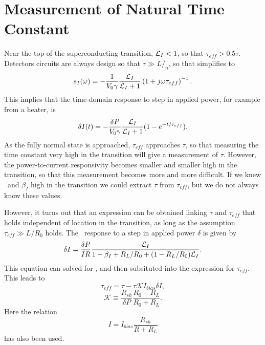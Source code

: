 \section{Measurement of Natural Time Constant}

Near the top of the superconducting transition, $\mathcal{L}_I < 1$, so that $\tau_{eff} > 0.5 \tau$.
Detectors circuits are always design so that $\tau \gg L/_n$, so that  simplifies to
\begin{equation}
s_I(\omega) = - \frac{1}{V_0 \gamma}\frac{\mathcal{L}_I}{\mathcal{L}_I + 1}
                       \left(1 + j \omega \tau_{eff}\right)^{-1}.
\end{equation} \label{eqn:htr-step-resp-high}
This implies that the time-domain response to step in applied power, for example from a heater, is
\begin{equation}
\delta I(t) = - \frac{\delta P}{V_0 \gamma}\frac{\mathcal{L}_I}{\mathcal{L}_I + 1}
                (1 - e^{-t/\tau_{eff}}).
\end{equation}
As the fully normal state is approached, $\tau_{eff}$ approaches $\tau$, so that measuring the time constant very high in the transition will give a measurement of $\tau$.
However, the power-to-current  responsivity becomes smaller and smaller high in the transition, so that this measurement becomes more and more difficult.
If we knew \Loop\ and $\beta_I$ high in the transition we could extract $\tau$ from $\tau_{eff}$, but we do not always know these values.

However, it turns out that an expression can be obtained linking $\tau$ and $\tau_{eff}$ that holds independent of location in the transition, as long as the assumption $\tau_{eff} \gg L/R_0$ holds.
The \DC\ response to a step in applied power $\delta $ is given by
\begin{equation}
\delta I = \frac{\delta P}{I R}\frac{\mathcal{L}_I}{1 + \beta_I + R_L/R_0 + (1 - R_L / R_0)\mathcal{L}_I}.
\end{equation}
This equation can solved for \Loop, and then subsituted into the expression for $\tau_{eff}$.
This leads to
\begin{equation}\label{eqn:teff-from-tau}
\tau_{eff} = \tau - \tau \mathcal{K} I_{bias} \delta I,
\end{equation}
\begin{equation}
\mathcal{K} \equiv \frac{R_{sh}}{\delta P} \frac{R_0 - R_L}{R_0 + R_L}.
\end{equation}
Here the relation
\begin{equation}
I = I_{bias}\frac{R_{sh}}{R + R_L}
\end{equation}
has also been used.

